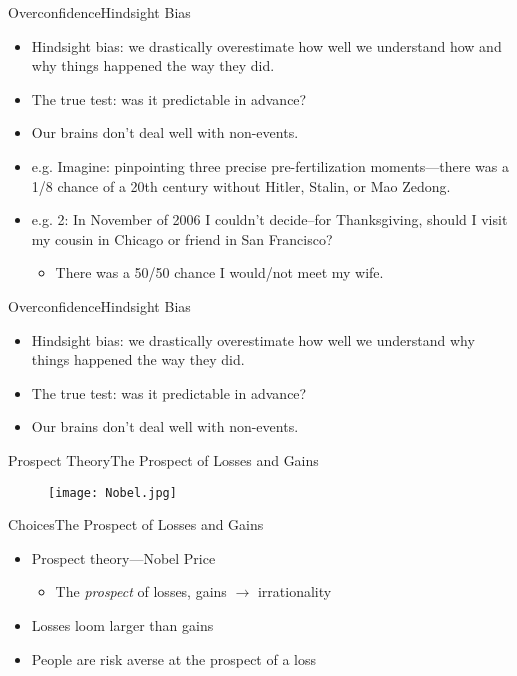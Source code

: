 \documentclass{beamer}
\begin{document}
\begin{frame}{Overconfidence}{Hindsight Bias}
\begin{itemize}
\addtolength{\itemsep}{0.5\baselineskip}
\item Hindsight bias: we drastically overestimate how well we understand how and why things happened the way they did. 
\item The true test: was it predictable in advance?
\item Our brains don't deal well with non-events.
\item e.g. Imagine: pinpointing three precise pre-fertilization moments---there was a 1/8 chance of a 20th century without Hitler, Stalin, or Mao Zedong. 
\item e.g. 2: In November of 2006 I couldn't decide--for Thanksgiving, should I visit my cousin in Chicago or friend in San Francisco?
  \begin{itemize}
  \item There was a 50/50 chance I would/not meet my wife.
  \end{itemize}
\end{itemize}
\end{frame}

\begin{frame}{Overconfidence}{Hindsight Bias}
\begin{itemize}
\addtolength{\itemsep}{0.5\baselineskip}
\item Hindsight bias: we drastically overestimate how well we understand why things happened the way they did. 
\item The true test: was it predictable in advance?
\item Our brains don't deal well with non-events.
\end{itemize}
\end{frame}

\begin{frame}{Prospect Theory}{The Prospect of Losses and Gains}
    \begin{figure}[H]
  	\centering
  	\texttt{[image: Nobel.jpg]}
  	\end{figure}
\end{frame}

\begin{frame}{Choices}{The Prospect of Losses and Gains}
  \begin{itemize}
  \addtolength{\itemsep}{0.5\baselineskip}
  \item Prospect theory---Nobel Price
        \begin{itemize}
        \item The {\it prospect} of losses, gains $\rightarrow$ irrationality
        \end{itemize}
  \item Losses loom larger than gains
  \item People are risk averse at the prospect of a loss
  \end{itemize}
\end{frame}
\end{document}
